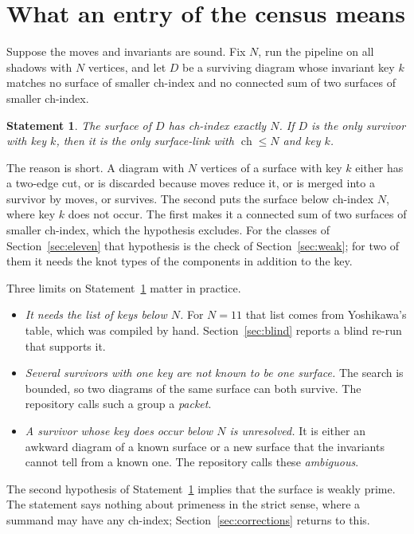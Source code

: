 \documentclass[11pt]{amsart}
\newcommand{\ch}{\operatorname{ch}}
\theoremstyle{plain}
\newtheorem{fact}{Statement}
\theoremstyle{remark}
\begin{document}
\section{What an entry of the census means}\label{sec:meaning}

Suppose the moves and invariants are sound. Fix $N$, run the pipeline on all shadows with $N$ vertices,
and let $D$ be a surviving diagram whose invariant key $k$ matches no surface of smaller ch-index and no
connected sum of two surfaces of smaller ch-index.

\begin{fact}\label{st:new}
The surface of $D$ has ch-index exactly $N$. If $D$ is the only survivor with key $k$, then it is the
only surface-link with $\ch\le N$ and key $k$.
\end{fact}

The reason is short. A diagram with $N$ vertices of a surface with key $k$ either has a two-edge cut,
or is discarded because moves reduce it, or is merged into a survivor by moves, or survives. The second
puts the surface below ch-index $N$, where key $k$ does not occur. The first makes it a connected sum of
two surfaces of smaller ch-index, which the hypothesis excludes. For the classes of
Section~\ref{sec:eleven} that hypothesis is the check of Section~\ref{sec:weak}; for two of them it needs
the knot types of the components in addition to the key.

Three limits on Statement~\ref{st:new} matter in practice.

\begin{itemize}[leftmargin=*]
\item \emph{It needs the list of keys below $N$.} For $N=11$ that list comes from Yoshikawa's table,
which was compiled by hand. Section~\ref{sec:blind} reports a blind re-run that supports it.
\item \emph{Several survivors with one key are not known to be one surface.} The search is bounded, so two
diagrams of the same surface can both survive. The repository calls such a group a \emph{packet}.
\item \emph{A survivor whose key does occur below $N$ is unresolved.} It is either an awkward diagram of a
known surface or a new surface that the invariants cannot tell from a known one. The repository calls
these \emph{ambiguous}.
\end{itemize}

The second hypothesis of Statement~\ref{st:new} implies that the surface is weakly prime.
The statement says nothing about primeness in the strict sense, where a summand may have any ch-index;
Section~\ref{sec:corrections} returns to this.
\end{document}
